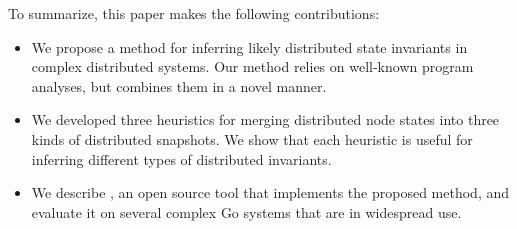 %
%
%
%
%

To summarize, this paper makes the following contributions:

\begin{itemize}

\item We propose a method for inferring likely distributed state
  invariants in complex distributed systems. Our method relies on
  well-known program analyses, but combines them in a novel manner.

\item We developed three heuristics for merging distributed node
  states into three kinds of distributed snapshots. We show that each
  heuristic is useful for inferring different types of distributed
  invariants.

\item We describe \dinv, an open source tool that implements the
  proposed method, and evaluate it on several complex Go systems that
  are in widespread use.

\end{itemize}


%
%


